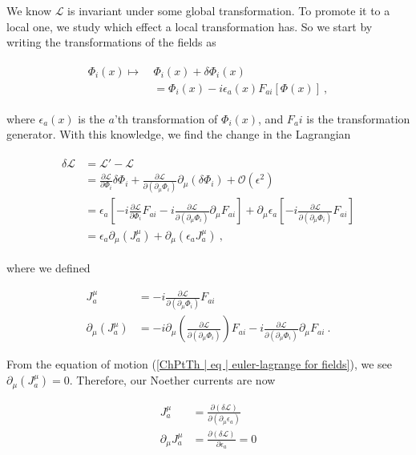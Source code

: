 \documentclass[10pt,twoside]{report}
\begin{document}
	We know $\mathcal{L}$ is invariant under some global transformation. To promote it to a local one, we study which effect a local transformation has. So we start by writing the transformations of the fields as
	
	\begin{align}
		\begin{split}
			\Phi_i(x) \mapsto \:& \Phi_i(x) + \delta\Phi_i(x) \\
			&= \Phi_i(x) - i\epsilon_a(x)F_{ai}[\Phi(x)]\:,
		\end{split}
	\end{align}
	
	\noindent where $\epsilon_a(x)$ is the $a$'th transformation of $\Phi_i(x)$, and $F_ai$ is the transformation generator. With this knowledge, we find the change in the Lagrangian
	
	\begin{align}
		\begin{split}
			\delta\mathcal{L} &= \mathcal{L}' - \mathcal{L}\\
			&= \frac{\partial\mathcal{L}}{\partial\Phi_i}\delta\Phi_i + \frac{\partial\mathcal{L}}{\partial(\partial_\mu\Phi_i)}\partial_\mu(\delta\Phi_i) + \mathcal{O}(\epsilon^2) \\
			&= \epsilon_a\left[ -i\frac{\partial\mathcal{L}}{\partial\Phi_i}F_{ai} - i\frac{\partial\mathcal{L}}{\partial(\partial_\mu\Phi_i)}\partial_\mu F_{ai} \right] + \partial_\mu\epsilon_a\left[ -i\frac{\partial\mathcal{L}}{\partial(\partial_\mu\Phi_i)}F_{ai} \right] \\
			&= \epsilon_a\partial_\mu( J_a^\mu) + \partial_\mu( \epsilon_aJ_a^\mu)\:,
		\end{split}
	\end{align}
	
	\noindent where we defined
	
	\begin{align}
		J_a^\mu &= -i\frac{\partial\mathcal{L}}{\partial(\partial_\mu\Phi_i)}F_{ai} \\
		\partial_\mu(J_a^\mu) &= -i\partial_\mu\left(\frac{\partial\mathcal{L}}{\partial(\partial_\mu\Phi_i)}\right)F_{ai} - i\frac{\partial\mathcal{L}}{\partial(\partial_\mu\Phi_i)}\partial_\mu F_{ai}\:.
	\end{align}
	
	From the equation of motion (\ref{ChPtTh | eq | euler-lagrange for fields}), we see $\partial_\mu(J_a^\mu)=0$. Therefore, our Noether currents are now
	
	\begin{align}
		J_a^\mu &= \frac{\partial (\delta\mathcal{L})}{\partial(\partial_\mu\epsilon_a)} \\
		\partial_\mu J_a^\mu &= \frac{\partial (\delta\mathcal{L})}{\partial\epsilon_a} = 0
	\end{align}
	
\end{document}
